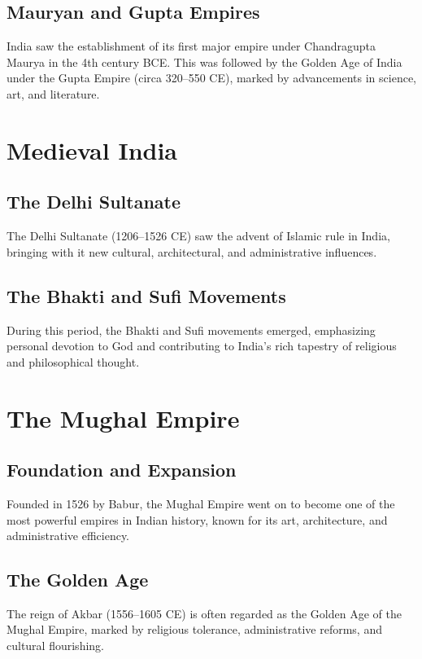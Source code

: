 \documentclass[a4paper,12pt]{book}
\begin{document}
\subsection{Mauryan and Gupta Empires}
India saw the establishment of its first major empire under Chandragupta Maurya in the 4th century BCE. This was followed by the Golden Age of India under the Gupta Empire (circa 320–550 CE), marked by advancements in science, art, and literature.

\section{Medieval India}
\label{sec:medieval-india}

\subsection{The Delhi Sultanate}
The Delhi Sultanate (1206–1526 CE) saw the advent of Islamic rule in India, bringing with it new cultural, architectural, and administrative influences.

\subsection{The Bhakti and Sufi Movements}
During this period, the Bhakti and Sufi movements emerged, emphasizing personal devotion to God and contributing to India’s rich tapestry of religious and philosophical thought.

\section{The Mughal Empire}
\label{sec:mughal-empire}

\subsection{Foundation and Expansion}
Founded in 1526 by Babur, the Mughal Empire went on to become one of the most powerful empires in Indian history, known for its art, architecture, and administrative efficiency.

\subsection{The Golden Age}
The reign of Akbar (1556–1605 CE) is often regarded as the Golden Age of the Mughal Empire, marked by religious tolerance, administrative reforms, and cultural flourishing.
\end{document}
